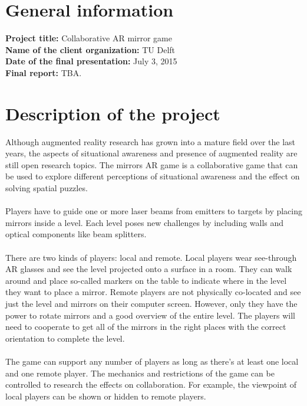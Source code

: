 \documentclass[]{article}
\begin{document}
\section*{General information}
\textbf{Project title:} Collaborative AR mirror game\\
\textbf{Name of the client organization:} TU Delft\\
\textbf{Date of the final presentation:} July 3, 2015\\
\textbf{Final report:} TBA.\\

\section*{Description of the project}
Although augmented reality research has grown into a mature field over the last
years, the aspects of situational awareness and presence of augmented reality
are still open research topics. The mirrors AR game is a collaborative game that
can be used to explore different perceptions of situational awareness and the
effect on solving spatial puzzles. \\
\\
Players have to guide one or more laser beams from emitters to targets by
placing mirrors inside a level. Each level poses new challenges by including
walls and optical components like beam splitters. \\
\\
There are two kinds of players: local and remote. Local players wear see-through
AR glasses and see the level projected onto a surface in a room. They can walk
around and place so-called markers on the table to indicate where in the level
they want to place a mirror. Remote players are not physically co-located and
see just the level and mirrors on their computer screen. However, only they have
the power to rotate mirrors and a good overview of the entire level. The players
will need to cooperate to get all of the mirrors in the right places with the
correct orientation to complete the level. \\
\\
The game can support any number of players as long as there's at least one local
and one remote player. The mechanics and restrictions of the game can be
controlled to research the effects on collaboration. For example, the viewpoint
of local players can be shown or hidden to remote players.
\end{document}
